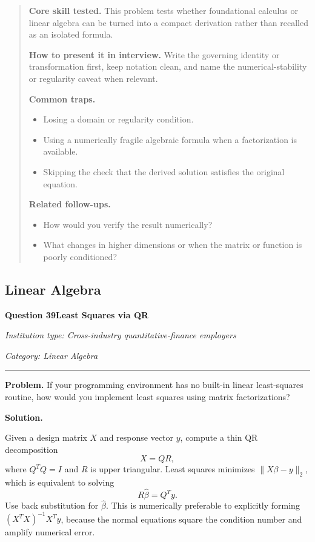 \documentclass[11pt,letterpaper,openany]{book}
\newenvironment{EditorialNote}
  {\begin{quote}\small\setlength{\parskip}{0.25em}}
  {\end{quote}}
\newcommand{\QuestionSpacer}{\vspace{0.4em}}
\newcommand{\FoundationQuestionHeader}[3]{%
  \vspace{1.0em}%
  {\large\bfseries #1\enspace #2\par}%
  {\small\itshape Institution type: Cross-industry quantitative-finance employers\par}%
  {\small\itshape Category: #3\par}%
  \vspace{0.25em}\hrule\vspace{0.45em}%
}
\begin{document}
\begin{EditorialNote}


\textbf{Core skill tested.} This problem tests whether foundational calculus or linear algebra can be turned into a compact derivation rather than recalled as an isolated formula.


\textbf{How to present it in interview.} Write the governing identity or transformation first, keep notation clean, and name the numerical-stability or regularity caveat when relevant.


\textbf{Common traps.}
\begin{itemize}
\item Losing a domain or regularity condition.
\item Using a numerically fragile algebraic formula when a factorization is available.
\item Skipping the check that the derived solution satisfies the original equation.
\end{itemize}


\textbf{Related follow-ups.}
\begin{itemize}
\item How would you verify the result numerically?
\item What changes in higher dimensions or when the matrix or function is poorly conditioned?
\end{itemize}


\end{EditorialNote}
\QuestionSpacer

\subsection{Linear Algebra}

\FoundationQuestionHeader{Question 39}{Least Squares via QR}{Linear Algebra}

\textbf{Problem.} If your programming environment has no built-in linear least-squares routine, how would you implement least squares using matrix factorizations?


\textbf{Solution.}

Given a design matrix \(X\) and response vector \(y\), compute a thin QR decomposition
\[
X=QR,
\]
where \(Q^TQ=I\) and \(R\) is upper triangular. Least squares minimizes \(\|X\beta-y\|_2\), which is equivalent to solving
\[
R\hat\beta=Q^Ty.
\]
Use back substitution for \(\hat\beta\). This is numerically preferable to explicitly forming \((X^TX)^{-1}X^Ty\), because the normal equations square the condition number and amplify numerical error.
\end{document}
